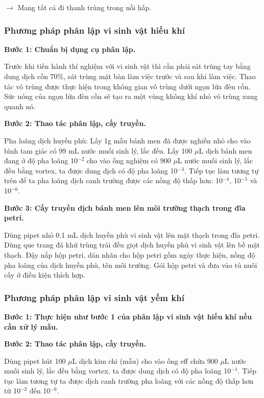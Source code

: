 $\rightarrow$ Mang tất cả đi thanh trùng trong nồi hấp.

\subsubsection{Phương pháp phân lập vi sinh vật hiếu khí}

\textbf{Bước 1: Chuẩn bị dụng cụ phân lập.}

Trước khi tiến hành thí nghiệm với vi sinh vật thì cần phải sát trùng tay bằng dung dịch cồn 70\%, sát trùng mặt bàn làm việc trước và sau khi làm việc. Thao tác vô trùng được thực hiện trong không gian vô trùng dưới ngọn lửa đèn cồn. Sức nóng của ngọn lửa đèn cồn sẽ tạo ra một vùng không khí nhỏ vô trùng xung quanh nó.

\textbf{Bước 2: Thao tác phân lập, cấy truyền.}

Pha loãng dịch huyền phù: Lấy 1g mẫu bánh men đã được nghiền nhỏ cho vào bình tam giác có 99 mL nước muối sinh lý, lắc đều. Lấy 100 $\mu$L dịch bánh men đang ở độ pha loãng 10$^{-2}$ cho vào ống nghiệm có 900 $\mu$L nước muối sinh lý, lắc đều bằng vortex, ta được dung dịch có độ pha loãng 10$^{-3}$. Tiếp tục làm tương tự trên để ta pha loãng dịch canh trường được các nồng độ thấp hơn: 10$^{-4}$, 10$^{-5}$ và 10$^{-6}$.

\textbf{Bước 3: Cấy truyền dịch bánh men lên môi trường thạch trong đĩa petri.}

Dùng pipet nhỏ 0.1 mL dịch huyền phù vi sinh vật lên mặt thạch trong đĩa petri. Dùng que trang đã khử trùng trải đều giọt dịch huyền phù vi sinh vật lên bề mặt thạch. Đậy nắp hộp petri, dán nhãn cho hộp petri gồm ngày thực hiện, nồng độ pha loãng của dịch huyền phù, tên môi trường. Gói hộp petri và đưa vào tủ nuôi cấy ở điều kiện thích hợp.

\subsubsection{Phương pháp phân lập vi sinh vật yếm khí}

\textbf{Bước 1: Thực hiện như bước 1 của phân lập vi sinh vật hiếu khí nếu cần xử lý mẫu.}

\textbf{Bước 2: Thao tác phân lập, cấy truyền.}

Dùng pipet hút 100 $\mu$L dịch kim chi (mẫu) cho vào ống eff chứa 900 $\mu$L nước muối sinh lý, lắc đều bằng vortex, ta được dung dịch có độ pha loãng 10$^{-1}$. Tiếp tục làm tương tự ta được dịch canh trường pha loãng với các nồng độ thấp hơn từ 10$^{-2}$ đến 10$^{-6}$.

